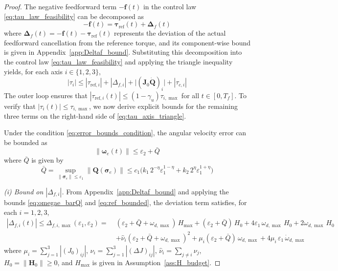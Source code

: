 \documentclass[journal]{new-aiaa}
\begin{document}
\begin{proof}
The negative feedforward term $-\boldsymbol{f}(t)$ in the control law \eqref{eq:tau_law_feasibility} can be decomposed as
\begin{equation}
-\boldsymbol{f}(t)=\boldsymbol{\tau}_{\mathrm{ref}}(t)+\boldsymbol{\Delta}_f(t)
\label{eq:f_split}
\end{equation}
where $\boldsymbol{\Delta}_f(t) = -\boldsymbol{f}(t)-\boldsymbol{\tau}_{\mathrm{ref}}(t)$ represents the deviation of the actual feedforward cancellation from the reference torque, and its component-wise bound
is given in Appendix~\ref{app:Deltaf_bound}. 
Substituting this decomposition into the control law \eqref{eq:tau_law_feasibility} and applying the triangle inequality yields, for each axis $i\in\{1,2,3\}$,
\begin{equation}
|\tau_i| \le |\tau_{\mathrm{ref},i}|+|\Delta_{f,i}|+\big|(\boldsymbol{J}_0\dot{\boldsymbol{Q}})_i\big|+|\tau_{c,i}|
\label{eq:tau_axis_triangle}
\end{equation}
The outer loop ensures that $|\tau_{\mathrm{ref},i}(t)|\le (1-\gamma_u)\tau_{i,\max}$ for all $t\in[0,T_f]$.
To verify that $|\tau_i(t)|\le \tau_{i,\max}$, we now derive explicit bounds for the remaining three terms on the 
right-hand side of \eqref{eq:tau_axis_triangle}.

Under the condition \eqref{eq:error_bounds_condition}, the angular velocity error can be bounded as
\begin{equation}
\|\boldsymbol{\omega}_e(t)\| \le \varepsilon_2 + \bar Q
\label{eq:wemax}
\end{equation}
where $\bar Q$ is given by
\begin{equation}
\bar Q =\sup_{\|\boldsymbol{\sigma}_e\|\le \varepsilon_1}\|\boldsymbol{Q}(\boldsymbol{\sigma}_e)\|
\le c_1\Big(k_1\,2^{-\eta}\varepsilon_1^{1-\eta}+k_2\,2^{\eta}\varepsilon_1^{1+\eta}\Big)
\label{eq:omegae_barQ}
\end{equation}


\emph{(i) Bound on $|\Delta_{f,i}|$.}
From Appendix~\ref{app:Deltaf_bound} and applying the bounds \eqref{eq:omegae_barQ} and \eqref{eq:ref_bounded}, 
the deviation term satisfies, for each $i=1,2,3$,
\begin{align}
|\Delta_{f,i}(t)|\le \Delta_{f,i,\max}(\varepsilon_1,\varepsilon_2) =\;&
(\varepsilon_2+\bar Q+\omega_{d,\max})\,H_{\max}
+(\varepsilon_2+\bar Q)\,H_0
+4\varepsilon_1\,\omega_{d,\max}\,H_0
+2\omega_{d,\max}\,H_0 \nonumber \\
&+\hat\nu_i(\varepsilon_2+\bar Q+\omega_{d,\max})^2
+\mu_i(\varepsilon_2+\bar Q)\,\omega_{d,\max}
+4\mu_i\,\varepsilon_1\,\dot\omega_{d,\max}
\label{eq:Deltaf_i_envelope_inproof}
\end{align}
where $\mu_i = \sum_{j=1}^{3}|(J_0)_{ij}|$, $\nu_i = \sum_{j=1}^{3}|(\Delta J)_{ij}|$, $\hat\nu_i = \sum_{j\ne i}\nu_j$,
$H_0 = \|\boldsymbol{H}_0\| \ge 0$, and $H_{\max}$ is given in Assumption~\ref{ass:H_budget}.


\end{proof}
\end{document}
